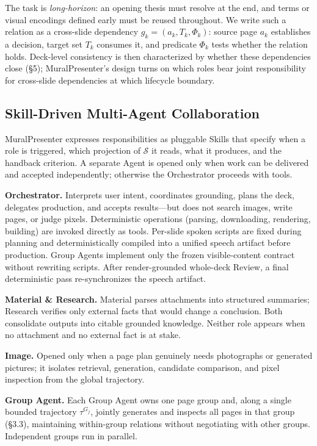 The task is \emph{long-horizon}: an opening thesis must resolve at the end, and terms or visual encodings defined early must be reused throughout. We write such a relation as a cross-slide dependency \(g_k=(a_k,T_k,\Phi_k)\): source page \(a_k\) establishes a decision, target set \(T_k\) consumes it, and predicate \(\Phi_k\) tests whether the relation holds. Deck-level consistency is then characterized by whether these dependencies close (§5); MuralPresenter's design turns on which roles bear joint responsibility for cross-slide dependencies at which lifecycle boundary.

\subsection{Skill-Driven Multi-Agent Collaboration}

MuralPresenter expresses responsibilities as pluggable Skills that specify when a role is triggered, which projection of \(\mathcal{S}\) it reads, what it produces, and the handback criterion. A separate Agent is opened only when work can be delivered and accepted independently; otherwise the Orchestrator proceeds with tools.

\textbf{Orchestrator.} Interprets user intent, coordinates grounding, plans the deck, delegates production, and accepts results—but does not search images, write pages, or judge pixels. Deterministic operations (parsing, downloading, rendering, building) are invoked directly as tools. Per-slide spoken scripts are fixed during planning and deterministically compiled into a unified speech artifact before production. Group Agents implement only the frozen visible-content contract without rewriting scripts. After render-grounded whole-deck Review, a final deterministic pass re-synchronizes the speech artifact.

\textbf{Material \& Research.} Material parses attachments into structured summaries; Research verifies only external facts that would change a conclusion. Both consolidate outputs into citable grounded knowledge. Neither role appears when no attachment and no external fact is at stake.

\textbf{Image.} Opened only when a page plan genuinely needs photographs or generated pictures; it isolates retrieval, generation, candidate comparison, and pixel inspection from the global trajectory.

\textbf{Group Agent.} Each Group Agent owns one page group and, along a single bounded trajectory \(\tau^{G_j}\), jointly generates and inspects all pages in that group (§3.3), maintaining within-group relations without negotiating with other groups. Independent groups run in parallel.

